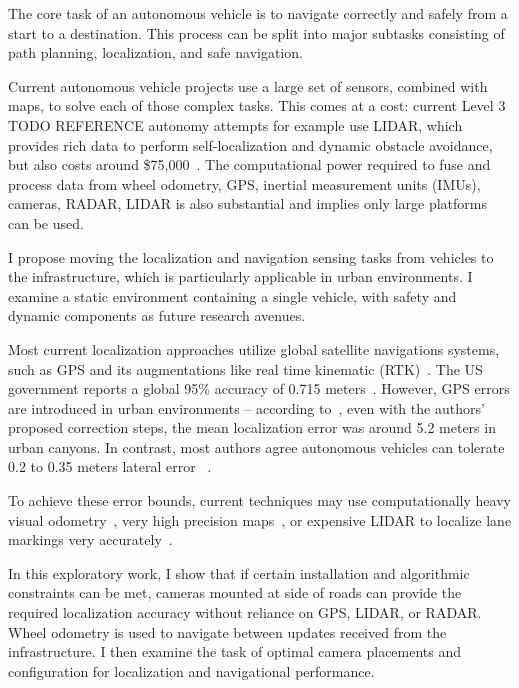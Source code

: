 \documentclass[a4paper,12pt,twoside,openright]{report}
\begin{document}
The core task of an autonomous vehicle is to navigate correctly and safely from a start
to a destination. This process can be split into major subtasks consisting
of path planning, localization, and safe navigation.

Current autonomous vehicle projects use a large set of sensors, combined with
maps, to solve each of those complex tasks. This comes at a cost: current
Level 3 TODO REFERENCE autonomy attempts for example use LIDAR, which 
provides rich data to perform self-localization and dynamic obstacle avoidance,
but also costs around \$75,000~\cite{lin2018architectural}. The computational
power required to fuse and process data from wheel odometry,
GPS, inertial measurement units (IMUs), cameras, RADAR, LIDAR is also substantial
and implies only large platforms can be used.

I propose moving the localization and navigation sensing tasks
from vehicles to the infrastructure, which is particularly applicable in urban environments.
I examine a static environment containing a single vehicle, with safety and dynamic components
as future research avenues.

Most current localization approaches utilize global satellite navigations systems,
such as GPS and its augmentations like real time kinematic (RTK)~\cite{scherzinger2000precise}.
The US government reports a global 95\% accuracy of 0.715 meters~\cite{USGPSPerformance}. 
However, GPS errors are introduced in urban environments -- according to~\citeauthor{miura2015gps}, even with the
authors' proposed correction steps, the mean localization error was around 5.2 meters in urban canyons. 
In contrast, most authors agree autonomous vehicles can tolerate 0.2 to 0.35 meters lateral error
~\cite{vivacqua2017low}\cite{ziegler2014video}\cite{mattern2010high}.

To achieve these error bounds, current techniques may use computationally heavy visual odometry~\cite{ziegler2014video},
very high precision maps~\cite{mattern2010high}, or expensive LIDAR to localize
lane markings very accurately~\cite{hata2014road}.  

In this exploratory work, I show that if certain installation and algorithmic constraints
can be met, cameras mounted at side of roads can provide the required localization
accuracy without reliance on GPS, LIDAR, or RADAR. Wheel odometry is used to navigate
between updates received from the infrastructure. I then examine the task of 
optimal camera placements and configuration for localization and navigational performance.
\end{document}
